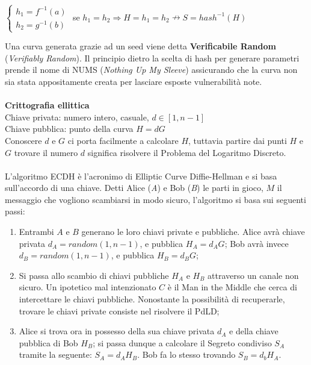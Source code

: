 \documentclass[a4paper,12pt]{tesiinfo}
\begin{document}
\begin{center}
$
\begin{cases}
  h_1 = f^{-1} (a)\\
  h_2 = g^{-1} (b)
\end{cases}$ se 
$h_1 = h_2 \Rightarrow H=h_1=h_2 \nrightarrow S=hash^{-1} (H)$
\end{center}
Una curva generata grazie ad un seed viene detta \textbf{Verificabile Random} (\textit{Verifiably Random}). Il principio dietro la scelta di hash per generare parametri prende il nome di NUMS (\textit{Nothing Up My Sleeve}) assicurando che la curva non sia stata appositamente creata per lasciare esposte vulnerabilit\`a note.
\\
\\
\textbf{Crittografia ellittica}
\\
Chiave privata: numero intero, casuale, $d \in [1, n-1]$\\
Chiave pubblica: punto della curva $H = dG$\\
Conoscere $d$ e $G$ ci porta facilmente a calcolare $H$, tuttavia partire dai punti $H$ e $G$ trovare il numero $d$ significa risolvere il Problema del Logaritmo Discreto.
\\
\\
L'algoritmo ECDH \`e l'acronimo di Elliptic Curve Diffie-Hellman e si basa sull'accordo di una chiave. Detti Alice (\textit{A}) e Bob (\textit{B}) le parti in gioco, $M$ il messaggio che vogliono scambiarsi in modo sicuro, l'algoritmo si basa sui seguenti passi:
\begin{enumerate}
  \item Entrambi $A$ e $B$ generano le loro chiavi private e pubbliche. Alice avr\`a chiave privata $d_A = random(1, n-1)$, e pubblica $H_A = d_AG$; Bob avr\`a invece $d_B = random(1, n-1)$, e pubblica $H_B = d_BG$;
  
  \item Si passa allo scambio di chiavi pubbliche $H_A$ e $H_B$ attraverso un canale non sicuro. Un ipotetico mal intenzionato $C$ \`e il Man in the Middle che cerca di intercettare le chiavi pubbliche. Nonostante la possibilit\`a di recuperarle, trovare le chiavi private consiste nel risolvere il PdLD;
  
  \item Alice si trova ora in possesso della sua chiave privata $d_A$ e della chiave pubblica di Bob $H_B$; si passa dunque a calcolare il Segreto condiviso $S_A$ tramite la seguente: $S_A = d_AH_B$. Bob fa lo stesso trovando $S_B = d_bH_A$.
\end{enumerate}
\end{document}
